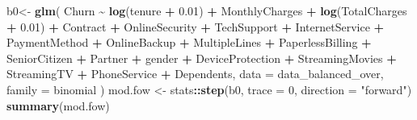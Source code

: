 \documentclass[
  twoside]{article}
\newenvironment{Shaded}{\begin{snugshade}}{\end{snugshade}}
\newcommand{\AttributeTok}[1]{\textcolor[rgb]{0.13,0.29,0.53}{#1}}
\newcommand{\DecValTok}[1]{\textcolor[rgb]{0.00,0.00,0.81}{#1}}
\newcommand{\FloatTok}[1]{\textcolor[rgb]{0.00,0.00,0.81}{#1}}
\newcommand{\FunctionTok}[1]{\textcolor[rgb]{0.13,0.29,0.53}{\textbf{#1}}}
\newcommand{\NormalTok}[1]{#1}
\newcommand{\OtherTok}[1]{\textcolor[rgb]{0.56,0.35,0.01}{#1}}
\newcommand{\SpecialCharTok}[1]{\textcolor[rgb]{0.81,0.36,0.00}{\textbf{#1}}}
\newcommand{\StringTok}[1]{\textcolor[rgb]{0.31,0.60,0.02}{#1}}
\begin{document}
\begin{Shaded}
\begin{Highlighting}[]
\NormalTok{b0}\OtherTok{\textless{}{-}} \FunctionTok{glm}\NormalTok{(}
\NormalTok{  Churn }\SpecialCharTok{\textasciitilde{}} \FunctionTok{log}\NormalTok{(tenure }\SpecialCharTok{+} \FloatTok{0.01}\NormalTok{)}
  \SpecialCharTok{+}\NormalTok{ MonthlyCharges}
  \SpecialCharTok{+} \FunctionTok{log}\NormalTok{(TotalCharges }\SpecialCharTok{+} \FloatTok{0.01}\NormalTok{)}
  \SpecialCharTok{+}\NormalTok{ Contract }\SpecialCharTok{+}\NormalTok{ OnlineSecurity }\SpecialCharTok{+}\NormalTok{ TechSupport }\SpecialCharTok{+}\NormalTok{ InternetService }\SpecialCharTok{+}\NormalTok{ PaymentMethod }
  \SpecialCharTok{+}\NormalTok{ OnlineBackup }\SpecialCharTok{+}\NormalTok{ MultipleLines }\SpecialCharTok{+}\NormalTok{ PaperlessBilling }\SpecialCharTok{+}\NormalTok{ SeniorCitizen }\SpecialCharTok{+}\NormalTok{ Partner }
  \SpecialCharTok{+}\NormalTok{ gender }\SpecialCharTok{+}\NormalTok{ DeviceProtection }\SpecialCharTok{+}\NormalTok{ StreamingMovies }\SpecialCharTok{+}\NormalTok{ StreamingTV }\SpecialCharTok{+}\NormalTok{ PhoneService }
  \SpecialCharTok{+}\NormalTok{ Dependents,}
  \AttributeTok{data =}\NormalTok{ data\_balanced\_over,}
  \AttributeTok{family =}\NormalTok{ binomial}
\NormalTok{)}
\NormalTok{mod.fow }\OtherTok{\textless{}{-}}\NormalTok{ stats}\SpecialCharTok{::}\FunctionTok{step}\NormalTok{(b0, }\AttributeTok{trace =} \DecValTok{0}\NormalTok{, }\AttributeTok{direction =} \StringTok{"forward"}\NormalTok{)}
\FunctionTok{summary}\NormalTok{(mod.fow)}
\end{Highlighting}
\end{Shaded}
\end{document}
